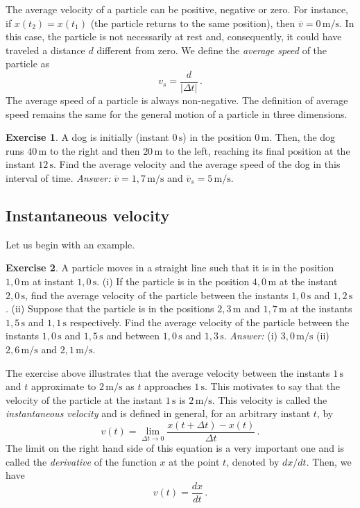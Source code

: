 \documentclass[12pt,a4paper]{article}
\theoremstyle{definition}
\newtheorem{ex}{Exercise}[section]
\begin{document}
The average velocity of a particle can be positive, negative or
zero. For instance, if $x(t_2)=x(t_1)$ (the particle returns to the
same position), then $\overline{v}=0\,\mathrm{m/s}$. In this case, the
particle is not necessarily at rest and, consequently, it could have
traveled a distance $d$ different from zero. We define the
\emph{average speed} of the particle as
$$v_s=\frac{d}{|\Delta t|}\,.$$
The average speed of a particle is always non-negative. The definition
of average speed remains the same for the general motion of a particle
in three dimensions.
\begin{ex}
  A dog is initially (instant $0\,\mathrm{s}$) in the position
  $0\,\mathrm{m}$. Then, the dog runs $40\,\mathrm{m}$ to the right
  and then $20\,\mathrm{m}$ to the left, reaching its final position
  at the instant $12\,\mathrm{s}$. Find the average velocity and the
  average speed of the dog in this interval of time. \emph{Answer:}
  $\overline{v}=1{,}7\,\mathrm{m/s}$ and
  $\overline{v}_s=5\,\mathrm{m/s}$.
\end{ex}

\subsection{Instantaneous velocity}

Let us begin with an example.

\begin{ex}
  A particle moves in a straight line such that it is in the position
  $1{,}0\,\mathrm{m}$ at instant $1{,}0\,\mathrm{s}$. (i) If the
  particle is in the position $4{,}0\,\mathrm{m}$ at the instant
  $2{,}0\,\mathrm{s}$, find the average velocity of the particle
  between the instants $1{,}0\,\mathrm{s}$ and
  $1{,}2\,\mathrm{s}$. (ii) Suppose that the particle is in the
  positions $2{,}3\,\mathrm{m}$ and $1{,}7\,\mathrm{m}$ at the
  instants $1{,}5\,\mathrm{s}$ and $1{,}1\,\mathrm{s}$
  respectively. Find the average velocity of the particle between the
  instants $1{,}0\,\mathrm{s}$ and $1{,}5\,\mathrm{s}$ and between
  $1{,}0\,\mathrm{s}$ and $1{,}3\,\mathrm{s}$. \emph{Answer:} (i)
  $3{,}0\,\mathrm{m/s}$ (ii) $2{,}6\,\mathrm{m/s}$ and
  $2{,}1\,\mathrm{m/s}$.
\end{ex}

The exercise above illustrates that the average velocity between the
instants $1\,\mathrm{s}$ and $t$ approximate to $2\,\mathrm{m/s}$ as
$t$ approaches $1\,\mathrm{s}$. This motivates to say that the
velocity of the particle at the instant $1\,\mathrm{s}$ is
$2\,\mathrm{m/s}$. This velocity is called the \emph{instantaneous
  velocity} and is defined in general, for an arbitrary instant $t$,
by
$$v(t)=\lim_{\Delta t\to 0}\frac{x(t+\Delta t)-x(t)}{\Delta t}\,.$$
The limit on the right hand side of this equation is a very important
one and is called the \emph{derivative} of the function $x$ at the
point $t$, denoted by $dx/dt$. Then, we have
$$v(t)=\frac{dx}{dt}\,.$$
\end{document}
